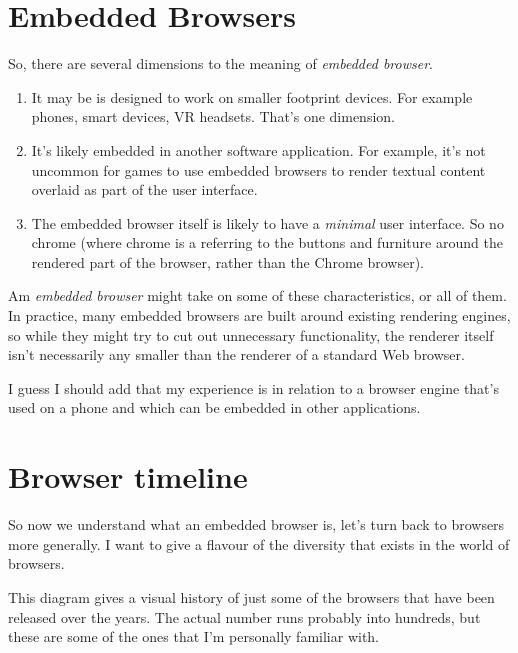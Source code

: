 \documentclass{article}
\begin{document}

\section{Embedded Browsers}

So, there are several dimensions to the meaning of {\it embedded browser\/}.

\begin{enumerate}
\item It may be is designed to work on smaller footprint devices. For example phones, smart devices, VR headsets. That's one dimension.
\item It's likely embedded in another software application. For example, it's not uncommon for games to use embedded browsers to render textual content overlaid as part of the user interface.
\item The embedded browser itself is likely to have a {\it minimal\/} user interface. So no chrome (where chrome is a referring to the buttons and furniture around the rendered part of the browser, rather than the Chrome browser).
\end{enumerate}

Am {\it embedded browser\/} might take on some of these characteristics, or all of them. In practice, many embedded browsers are built around existing rendering engines, so while they might try to cut out unnecessary functionality, the renderer itself isn't necessarily any smaller than the renderer of a standard Web browser.

I guess I should add that my experience is in relation to a browser engine that's used on a phone and which can be embedded in other applications.


\section{Browser timeline}

So now we understand what an embedded browser is, let's turn back to browsers more generally. I want to give a flavour of the diversity that exists in the world of browsers.

This diagram gives a visual history of just some of the browsers that have been released over the years. The actual number runs probably into hundreds, but these are some of the ones that I'm personally familiar with.
\end{document}
